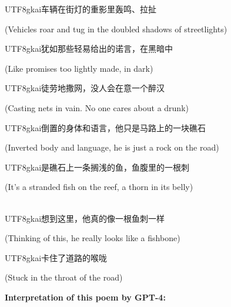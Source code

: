\documentclass[11pt]{article}
\begin{document}
\begin{center}
\begin{CJK}{UTF8}{gkai}车辆在街灯的重影里轰鸣、拉扯\end{CJK}

(Vehicles roar and tug in the doubled shadows of streetlights)

\begin{CJK}{UTF8}{gkai}犹如那些轻易给出的诺言，在黑暗中\end{CJK}

(Like promises too lightly made, in dark)

\begin{CJK}{UTF8}{gkai}徒劳地撒网，没人会在意一个醉汉\end{CJK}

(Casting nets in vain. No one cares about a drunk)

\begin{CJK}{UTF8}{gkai}倒置的身体和语言，他只是马路上的一块礁石\end{CJK}

(Inverted body and language, he is just a rock on the road)

\begin{CJK}{UTF8}{gkai}是礁石上一条搁浅的鱼，鱼腹里的一根刺\end{CJK}

(It's a stranded fish on the reef, a thorn in its belly)\\\



\begin{CJK}{UTF8}{gkai}想到这里，他真的像一根鱼刺一样\end{CJK}

(Thinking of this, he really looks like a fishbone)

\begin{CJK}{UTF8}{gkai}卡住了道路的喉咙\end{CJK}

(Stuck in the throat of the road)
\end{center} 



\textbf{Interpretation of this poem by GPT-4:}
\end{document}
